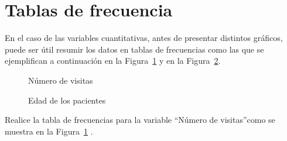 \documentclass{prob}
\begin{document}
\section*{Tablas de frecuencia}    
    \begin{problema}
    En el caso de las variables cuantitativas, antes de presentar distintos gráficos, puede ser útil resumir los datos en tablas de frecuencias como las que se ejemplifican a continuación en la Figura~\ref{fig:tabla2} y en la Figura~\ref{fig:tabla3}.
    
    \begin{figure}[!ht]
    \centering
    
    \caption{Número de visitas}
    \label{fig:tabla2}
	\end{figure}

    \begin{figure}[!ht]
    \centering
    
    \caption{Edad de los pacientes}
    \label{fig:tabla3}
	\end{figure}
	
	\begin{parte}
		Realice la tabla de frecuencias para la variable \textquotedblleft Número de visitas\textquotedblright como se muestra en la Figura~\ref{fig:tabla2} . \\
	
\noindent{}	
	\end{parte}
	

\end{problema}
\end{document}
